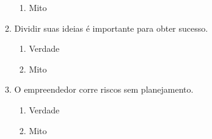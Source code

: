 \begin{enumerate}[noitemsep]
\begin{enumerate}[noitemsep]
\begin{enumerate}[noitemsep]
                \item Mito
            \end{enumerate}
            \item Dividir suas ideias é importante para obter sucesso.
            \begin{enumerate}[noitemsep]
                \item Verdade
                \item Mito
            \end{enumerate}
            \item O empreendedor corre riscos sem planejamento.
            \begin{enumerate}[noitemsep]
                \item Verdade
                \item Mito
            \end{enumerate}
        \end{enumerate}
\end{enumerate}
